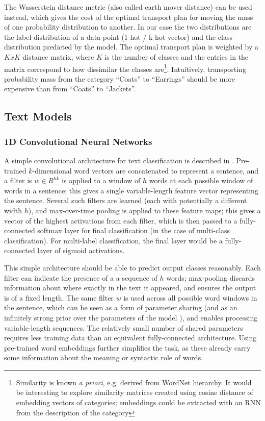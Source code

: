 The Wasserstein distance metric (also called earth mover distance) can be used instead, which gives the cost of the optimal transport plan for moving the mass of one probability distribution to another.
In our case the two distributions are the label distribution of a data point (1-hot / k-hot vector) and the class distribution predicted by the model.
The optimal transport plan is weighted by a $KxK$ distance matrix, where $K$ is the number of classes and the entries in the matrix correspond to how dissimilar the classes are\footnote{Similarity is known \textit{a priori}, e.g. derived from WordNet hierarchy. It would be interesting to explore similarity matrices created using cosine distance of embedding vectors of categories; embeddings could be extracted with an RNN from the description of the category}.
Intuitively, transporting probability mass from the category ``Coats'' to ``Earrings'' should be more expensive than from ``Coats'' to ``Jackets''.


\subsection{Text Models}
\label{text_models}

\subsubsection{1D Convolutional Neural Networks}

A simple convolutional architecture for text classification is described in \cite{1dcnn}.
Pre-trained $k$-dimensional word vectors are concatenated to represent a sentence, and a filter is $w \in R^{hk}$ is applied to a window of $h$ words at each possible window of words in a sentence; this gives a single variable-length feature vector representing the sentence.
Several such filters are learned (each with potentially a different width $h$), and max-over-time pooling is applied to these feature maps; this gives a vector of the highest activations from each filter, which is then passed to a fully-connected softmax layer for final classification (in the case of multi-class classification).
For multi-label classification, the final layer would be a fully-connected layer of sigmoid activations.

This simple architecture should be able to predict output classes reasonably.
Each filter can indicate the presence of a a sequence of $h$ words; max-pooling discards information about where exactly in the text it appeared, and ensures the output is of a fixed length.
The same filter $w$ is used across all possible word windows in the sentence, which can be seen as a form of parameter sharing (and as an infinitely strong prior over the parameters of the model \cite{dlb}), and enables processing variable-length sequences.
The relatively small number of shared parameters requires less training data than an equivalent fully-connected architecture.
Using pre-trained word embeddings further simplifies the task, as these already carry some information about the meaning or syntactic role of words.

